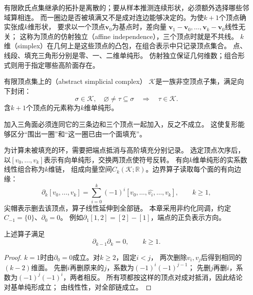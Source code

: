 有限欧氏点集继承的拓扑是离散的；要从样本推测连续形状，必须额外选择哪些邻域算相连。
而一圈边是否被填满又不是成对连边能够决定的。为使$k+1$个顶点确实张成$k$维形状，
要求以一个顶点$\bm v_0$为基点时，差向量
$\bm v_1-\bm v_0,\ldots,\bm v_k-\bm v_0$线性无关；
这称为顶点的仿射独立（affine independence），三个顶点时就是不共线。
$k$维（simplex）在几何上是这些顶点的凸包，在组合表示中只记录顶点集合。
点、线段、填充三角形分别是零、一、二维单纯形。
仿射独立保证几何维数；组合形式则用于指定哪些高阶面存在。

\begin{definition}[抽象单纯复形]
\label{def:geometry-simplicial-complex}
有限顶点集上的（abstract simplicial complex）
$\mathcal K$是一族非空顶点子集，满足向下封闭：
\begin{equation}
 \sigma\in\mathcal K,\quad\varnothing\neq\tau\subseteq\sigma
 \quad\Longrightarrow\quad\tau\in\mathcal K.
 \label{eq:geometry-simplicial-complex-closure}
\end{equation}
含$k+1$个顶点的元素称为$k$维单纯形。
\end{definition}
加入三角面必须连同它的三条边和三个顶点一起加入，反之不成立。
这使复形能够区分“围出一圈”和“这一圈已由一个面填充”。


为计算未被填充的环，需要把端点抵消与高阶填充分别记录。
选定顶点次序后，以$[v_0,\ldots,v_k]$表示有向单纯形，交换两顶点使符号反转。
有向$k$维单纯形的实系数线性组合称为$k$维链，
组成向量空间$C_k(\mathcal K;\mathbb R)$。边界算子读取每个面的有向边缘：
\begin{equation}
 \partial_k[v_0,\ldots,v_k]
 =\sum_{i=0}^k(-1)^i[v_0,\ldots,\widehat{v_i},\ldots,v_k],
 \qquad k\geq1,
 \label{eq:geometry-simplicial-boundary}
\end{equation}
尖帽表示删去该顶点，算子线性延伸到全部链。
本章采用非约化同调，约定$C_{-1}=\{0\}$、$\partial_0=0$。
例如$\partial_1[1,2]=[2]-[1]$，端点的正负表示方向。

\begin{lemma}[边界的边界为零]
\label{lem:geometry-boundary-squared-zero}
上述算子满足
\begin{equation}
 \partial_{k-1}\partial_k=0,\qquad k\geq1.
 \label{eq:geometry-boundary-squared-zero}
\end{equation}
\end{lemma}
\begin{proof}
$k=1$时由$\partial_0=0$成立。对$k\geq2$，固定$i<j$，
两次删除$v_i,v_j$后得到相同的$(k-2)$维面。
先删$i$再删原来的$j$，系数为$(-1)^i(-1)^{j-1}$；
先删$j$再删$i$，系数为$(-1)^j(-1)^i$，两者相反。
所有项都按这样的顶点对成对抵消，因此结论对基单纯形成立；
由线性性，对全部链成立。
\end{proof}

